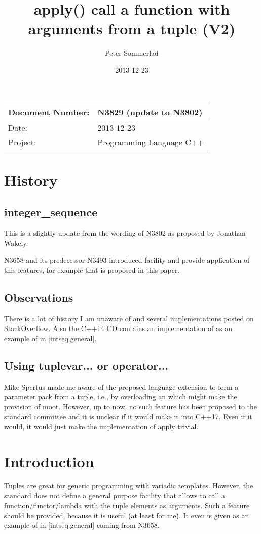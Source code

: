 \documentclass[ebook,11pt,article]{memoir}
\title{apply() call a function with arguments from a tuple (V2)
}
\author{Peter Sommerlad}
\date{2013-12-23}                                           %
\begin{document}
\maketitle
\begin{tabular}[t]{|l|l|}\hline 
Document Number: & N3829 (update to N3802) \\\hline
Date: & 2013-12-23 \\\hline
Project: & Programming Language C++\\\hline 
\end{tabular}
\chapter{History}
\section{integer_sequence}
This is a slightly update from the wording of N3802 as proposed by Jonathan Wakely.

N3658 and its predecessor N3493 introduced  facility and provide application of this features, for example  that is proposed in this paper.
\section{Observations}
There is a lot of history I am unaware of and several implementations posted on StackOverflow. Also the C++14 CD contains an implementation of  as an example of  in [intseq.general].
\section{Using tuplevar... or operator...}
Mike Spertus made me aware of the proposed language extension to form a parameter pack from a tuple, i.e., by overloading an  which might make the provision of  moot. However, up to now, no such feature has been proposed to the standard committee and it is unclear if it would make it into C++17. Even if it would, it would just make the implementation of apply trivial.
\chapter{Introduction}
Tuples are great for generic programming with variadic templates. However, the standard does not define a general purpose facility that allows to call a function/functor/lambda with the tuple elements as arguments. Such a feature should be provided, because it is useful (at least for me). It even is given as an example of  in [intseq.general] coming from N3658. 
\end{document}
